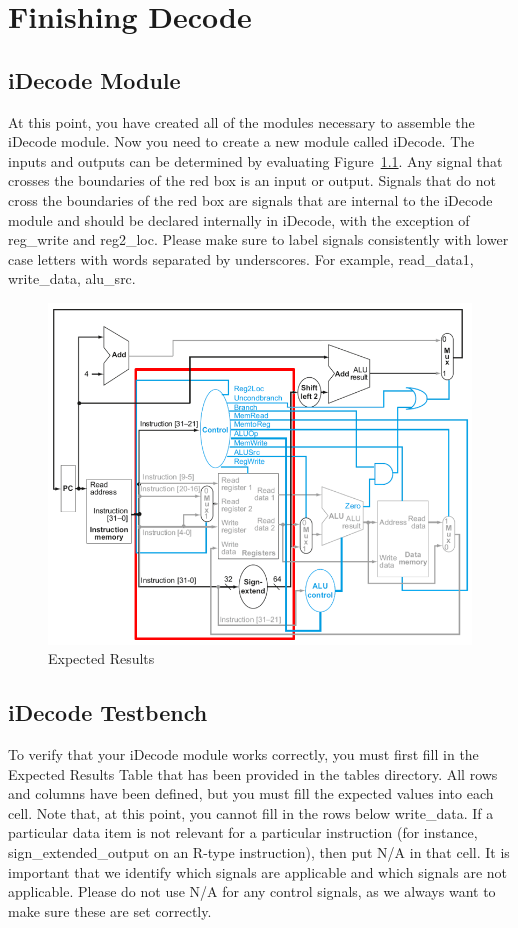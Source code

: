 \chapter{Finishing Decode}

\section{iDecode Module}
At this point, you have created all of the modules necessary to assemble the iDecode module.  Now you need to create a new module called iDecode.  The inputs and outputs can be determined by evaluating Figure~\ref{fig:decode_stage}.  Any signal that crosses the boundaries of the red box is an input or output.  Signals that do not cross the boundaries of the red box are signals that are internal to the iDecode module and should be declared internally in iDecode, with the exception of reg\_write and reg2\_loc.  Please make sure to label signals consistently with lower case letters with words separated by underscores.  For example, read\_data1, write\_data, alu\_src.

\begin{figure}
	\caption{Expected Results}\label{fig:decode_stage}
	\begin{center}
		\includegraphics[width=4.75in]{../images/decode_stage.png}
	\end{center}
\end{figure} 


\section{iDecode Testbench}
To verify that your iDecode module works correctly, you must first fill in the Expected Results Table that has been provided in the tables directory. All rows and columns have been defined, but you must fill the expected values into each cell.  Note that, at this point, you cannot fill in the rows below write\_data.  If a particular data item is not relevant for a particular instruction (for instance, sign\_extended\_output on an R-type instruction), then put N/A in that cell.  It is important that we identify which signals are applicable and which signals are not applicable.  Please do not use N/A for any control signals, as we always want to make sure these are set correctly.  

